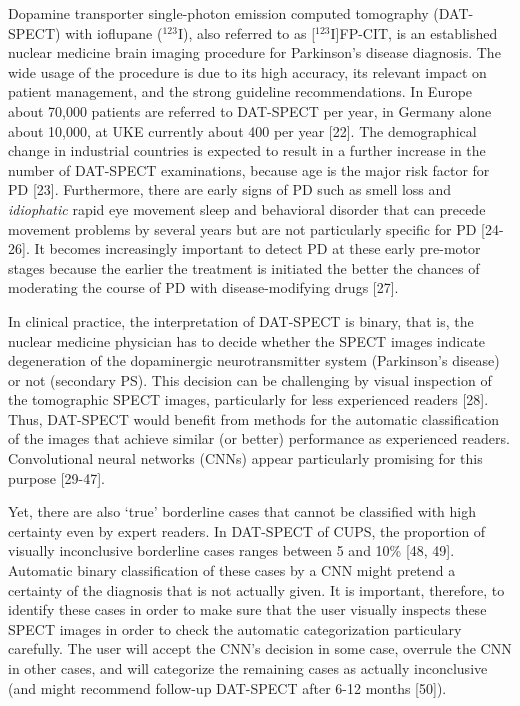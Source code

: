 Dopamine transporter single-photon emission computed tomography (DAT-SPECT) 
with ioflupane ($^{123}$I), also referred to as [$^{123}$I]FP-CIT, is an established nuclear medicine brain imaging procedure for Parkinson's disease diagnosis.
The wide usage of the procedure is due to its high accuracy, its relevant impact on patient management, 
and the strong guideline recommendations.
In Europe about 70,000 patients are referred to DAT-SPECT per year, in Germany alone about 10,000, at UKE currently about 400 per year [22]. 
The demographical change in industrial countries is expected to result in a further increase in the number of DAT-SPECT examinations, 
because age is the major risk factor for PD [23]. 
Furthermore, there are early signs of PD such as smell loss and \textit{idiophatic} rapid eye movement sleep and behavioral disorder 
that can precede movement problems by several years but are not particularly specific for PD [24-26]. 
It becomes increasingly important to detect PD at these early pre-motor stages because the earlier the treatment is initiated the better 
the chances of moderating the course of PD with disease-modifying drugs [27].


In clinical practice, the interpretation of DAT-SPECT is binary, that is, the nuclear medicine physician has to decide whether the SPECT images 
indicate degeneration of the dopaminergic neurotransmitter system (Parkinson's disease) or not (secondary PS). 
This decision can be challenging by visual inspection of the tomographic SPECT images, particularly for less experienced readers [28]. 
Thus, DAT-SPECT would benefit from methods for the automatic classification of the images that achieve similar (or better) performance as experienced readers. 
Convolutional neural networks (CNNs) appear particularly promising for this purpose [29-47].


Yet, there are also `true' borderline cases that cannot be classified with high certainty even by expert readers. 
In DAT-SPECT of CUPS, the proportion of visually inconclusive borderline cases ranges between 5 and 10\% [48, 49]. 
Automatic binary classification of these cases by a CNN might pretend a certainty of the diagnosis that is not actually given. 
It is important, therefore, to identify these cases in order to make sure that the user visually inspects these SPECT images 
in order to check the automatic categorization particulary carefully. 
The user will accept the CNN's decision in some case, overrule the CNN in other cases, and will categorize the remaining cases as 
actually inconclusive (and might recommend follow-up DAT-SPECT after 6-12 months [50]). 

